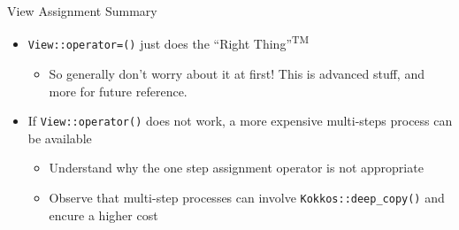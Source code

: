 \begin{frame}[fragile]{View Assignment Summary}

  \begin{itemize}
    \item {\texttt{View::operator=()} just does the ``Right Thing''\textsuperscript{TM}}
      \begin{itemize}
      \item So generally don't worry about it at first! This is advanced stuff, and more for future reference.
      \end{itemize}
    \item {If \texttt{View::operator()} does not work, a more expensive multi-steps process can be available}
      \begin{itemize}
      \item{Understand why the one step assignment operator is not appropriate}
      \item{Observe that multi-step processes can involve \texttt{Kokkos::deep\_copy()} and encure a higher cost}
      \end{itemize}
  \end{itemize}

\end{frame}
